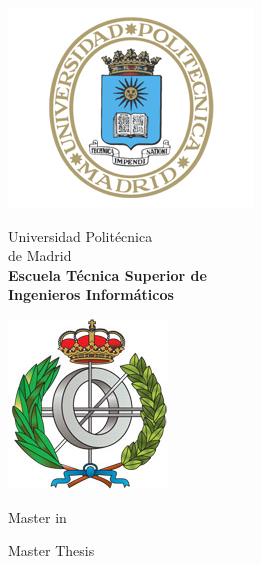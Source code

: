 \begin{titlepage}

\begin{minipage}{0.15\linewidth}
\hspace*{-2.5cm}
\noindent
\includegraphics[scale=0.5]{include/EscUpm.png} \qquad\qquad
\end{minipage}
\begin{minipage}{0.7\linewidth}
\begin{center}
\huge{ Universidad Politécnica\\de Madrid }\\
\vspace*{0.5cm}
\Large{\textbf{Escuela Técnica Superior de \\
Ingenieros Informáticos}}
\end{center}
\end{minipage}
\begin{minipage}{0.2\linewidth}
\includegraphics[scale=0.5]{include/FacInformatica.png} 
\end{minipage}

\vspace*{1cm}
\begin{center}
\Large{Master in  \Master{} }
\end{center}

\vspace*{1cm}
\begin{center}
\huge{ Master Thesis}
\end{center}


\end{titlepage}
